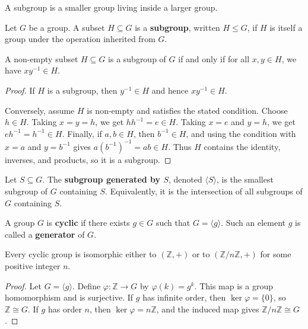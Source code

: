 A subgroup is a smaller group living inside a larger group.

\begin{definition}[Subgroup]
Let $G$ be a group. A subset $H\subseteq G$ is a \textbf{subgroup}, written $H\leq G$, if $H$ is itself a group under the operation inherited from $G$.
\end{definition}

\begin{lemma}
A non-empty subset $H\subseteq G$ is a subgroup of $G$ if and only if for all $x,y\in H$, we have $xy^{-1}\in H$.
\end{lemma}

\begin{proof}
If $H$ is a subgroup, then $y^{-1}\in H$ and hence $xy^{-1}\in H$.

Conversely, assume $H$ is non-empty and satisfies the stated condition. Choose $h\in H$. Taking $x=y=h$, we get $hh^{-1}=e\in H$. Taking $x=e$ and $y=h$, we get $eh^{-1}=h^{-1}\in H$. Finally, if $a,b\in H$, then $b^{-1}\in H$, and using the condition with $x=a$ and $y=b^{-1}$ gives $a(b^{-1})^{-1}=ab\in H$. Thus $H$ contains the identity, inverses, and products, so it is a subgroup.
\end{proof}

\begin{definition}
Let $S\subseteq G$. The \textbf{subgroup generated by $S$}, denoted $\langle S\rangle$, is the smallest subgroup of $G$ containing $S$. Equivalently, it is the intersection of all subgroups of $G$ containing $S$.
\end{definition}

\begin{definition}
A group $G$ is \textbf{cyclic} if there exists $g\in G$ such that $G=\langle g\rangle$. Such an element $g$ is called a \textbf{generator} of $G$.
\end{definition}

\begin{theorem}
Every cyclic group is isomorphic either to $(\mathbb{Z},+)$ or to $(\mathbb{Z}/n\mathbb{Z},+)$ for some positive integer $n$.
\end{theorem}

\begin{proof}
Let $G=\langle g\rangle$. Define $\varphi:\mathbb{Z}\to G$ by $\varphi(k)=g^k$. This map is a group homomorphism and is surjective. If $g$ has infinite order, then $\ker\varphi=\{0\}$, so $\mathbb{Z}\cong G$. If $g$ has order $n$, then $\ker\varphi=n\mathbb{Z}$, and the induced map gives $\mathbb{Z}/n\mathbb{Z}\cong G$.
\end{proof}

